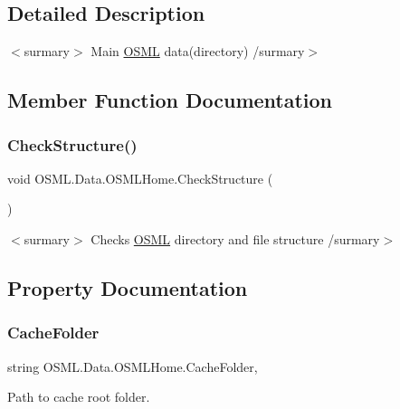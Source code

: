 \subsection{Detailed Description}
$<$surmary$>$ Main \mbox{\hyperlink{namespaceOSML}{O\+S\+ML}} data(directory) /surmary$>$ 

\subsection{Member Function Documentation}
\mbox{\label{classOSML_1_1Data_1_1OSMLHome_a097ce91f796027c23ca5f220157f56c9}} 
\subsubsection{\texorpdfstring{CheckStructure()}{CheckStructure()}}
{\footnotesize\ttfamily void O\+S\+M\+L.\+Data.\+O\+S\+M\+L\+Home.\+Check\+Structure (\begin{DoxyParamCaption}{ }\end{DoxyParamCaption})\hspace{0.3cm}{\ttfamily [inline]}}

$<$surmary$>$ Checks \mbox{\hyperlink{namespaceOSML}{O\+S\+ML}} directory and file structure /surmary$>$ 

\subsection{Property Documentation}
\mbox{\label{classOSML_1_1Data_1_1OSMLHome_a6edb591b8115f73bb984db19a75caafa}} 
\subsubsection{\texorpdfstring{CacheFolder}{CacheFolder}}
{\footnotesize\ttfamily string O\+S\+M\+L.\+Data.\+O\+S\+M\+L\+Home.\+Cache\+Folder\hspace{0.3cm}{\ttfamily [static]}, {\ttfamily [get]}}



Path to cache root folder. 


